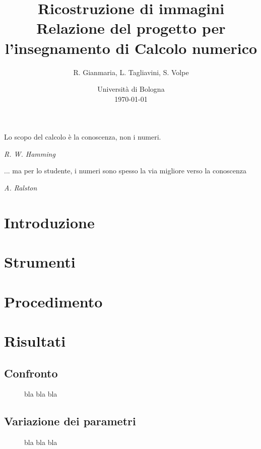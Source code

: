\documentclass[a4paper]{article}
\title{Ricostruzione di immagini \\ \large Relazione del progetto per l'insegnamento di Calcolo numerico}
\author{
  R. Gianmaria,
  L. Tagliavini,
  S. Volpe
}
\date{
	Universit\`a di Bologna \\
  \today
}
\begin{document}
\maketitle
\thispagestyle{empty}

\epigraph{Lo scopo del calcolo è la conoscenza, non i numeri.}
{\textit{R. W. Hamming}}
\epigraph{... ma per lo studente, i numeri sono spesso la via migliore verso la
conoscenza}
{\textit{A. Ralston}}

\section{Introduzione}

\section{Strumenti}

\section{Procedimento}

\section{Risultati}

\subsection{Confronto}

\begin{figure}
   \begin{center}
       \vspace*{-1.1in}
       \centerline{\scalebox{1.3}{}}
   \end{center}
   \vspace*{-0.2in}
   \caption{bla bla bla}
\end{figure}

\subsection{Variazione dei parametri}

\begin{figure}
    \begin{center}
        \scalebox{0.65}{}
    \end{center}
    \begin{center}
        \scalebox{0.65}{}
    \end{center}
    \begin{center}
      \scalebox{0.65}{}
    \end{center}
    \caption{bla bla bla}
\end{figure}
\end{document}
